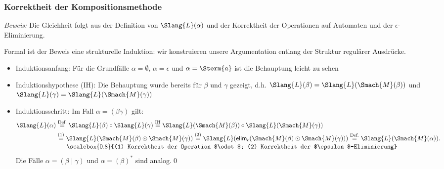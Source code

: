 \documentclass[aspectratio=1610,onlymath]{beamer}
\begin{document}
\begin{frame}\frametitle{Korrektheit der Kompositionsmethode}

\pause

\emph{Beweis:} Die Gleichheit folgt aus der Definition von $\Slang{L}(\alpha)$ und der Korrektheit der Operationen auf Automaten und der $\epsilon$-Eliminierung.\pause
\medskip

Formal ist der Beweis eine \alert{strukturelle Induktion}: wir konstruieren unsere Argumentation entlang der Struktur regulärer Ausdrücke.\pause
\begin{itemize}
\item \alert{Induktionsanfang:} Für die Grundfälle $\alpha=\emptyset$, $\alpha=\epsilon$ und $\alpha=\Sterm{a}$ ist die Behauptung leicht zu sehen\pause
\item \alert{Induktionshypothese (IH):} Die Behauptung wurde bereits für $\beta$ und $\gamma$ gezeigt, d.h. $\Slang{L}(\beta)=\Slang{L}(\Smach{M}(\beta))$ und $\Slang{L}(\gamma)=\Slang{L}(\Smach{M}(\gamma))$\pause
\item \alert{Induktionsschritt:} Im Fall $\alpha=(\beta\gamma)$ gilt:
% 
\begin{align*}
	\Slang{L}(\alpha) &\stackrel{\text{Def.}}{=}\Slang{L}(\beta)\circ\Slang{L}(\gamma)\stackrel{\text{IH}}{=}\Slang{L}(\Smach{M}(\beta))\circ\Slang{L}(\Smach{M}(\gamma))\\
	& \stackrel{\text{(1)}}{=} \Slang{L}(\Smach{M}(\beta)\odot\Smach{M}(\gamma))\stackrel{\text{(2)}}{=}\Slang{L}(\textsf{elim}_\epsilon(\Smach{M}(\beta)\odot\Smach{M}(\gamma)))\stackrel{\text{Def.}}{=}\Slang{L}(\Smach{M}(\alpha)).\\[-0.5ex]
	& ~~~~~\scalebox{0.8}{(1) Korrektheit der Operation $\odot$; (2) Korrektheit der $\epsilon$-Eliminierung}
\end{align*}%
% 
Die Fälle $\alpha=(\beta\mid\gamma)$ und $\alpha=(\beta)^*$ sind analog.\qed
\end{itemize}

\end{frame}
\end{document}
